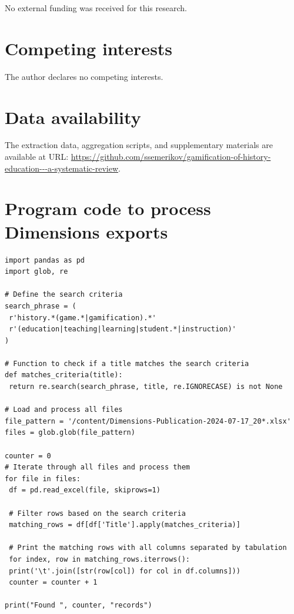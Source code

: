\documentclass[a4paper,fleqn]{cas-sc}
\begin{document}
No external funding was received for this research.

\section*{Competing interests}

The author declares no competing interests.

\section*{Data availability}

The extraction data, aggregation scripts, and supplementary materials are available at URL: \url{https://github.com/ssemerikov/gamification-of-history-education---a-systematic-review}.


%




\appendix

\section{Program code to process Dimensions exports\label{appA}}

{
\begin{verbatim}
import pandas as pd
import glob, re

# Define the search criteria
search_phrase = (
 r'history.*(game.*|gamification).*'
 r'(education|teaching|learning|student.*|instruction)'
)

# Function to check if a title matches the search criteria
def matches_criteria(title):
 return re.search(search_phrase, title, re.IGNORECASE) is not None

# Load and process all files
file_pattern = '/content/Dimensions-Publication-2024-07-17_20*.xlsx'
files = glob.glob(file_pattern)

counter = 0
# Iterate through all files and process them
for file in files:
 df = pd.read_excel(file, skiprows=1)
 
 # Filter rows based on the search criteria
 matching_rows = df[df['Title'].apply(matches_criteria)]
 
 # Print the matching rows with all columns separated by tabulation
 for index, row in matching_rows.iterrows():
 print('\t'.join([str(row[col]) for col in df.columns]))
 counter = counter + 1
 
print("Found ", counter, "records")
\end{verbatim}
}
\end{document}
